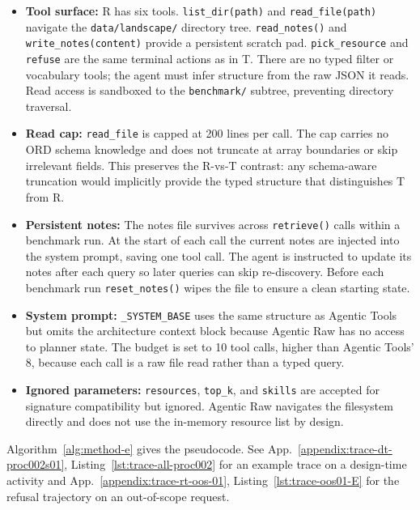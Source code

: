 \begin{itemize}
  \item \textbf{Tool surface:} R has six tools. \texttt{list\_dir(path)} and \texttt{read\_file(path)} navigate the \texttt{data/landscape/} directory tree. \texttt{read\_notes()} and \texttt{write\_notes(content)} provide a persistent scratch pad. \texttt{pick\_resource} and \texttt{refuse} are the same terminal actions as in T. There are no typed filter or vocabulary tools; the agent must infer structure from the raw JSON it reads. Read access is sandboxed to the \texttt{benchmark/} subtree, preventing directory traversal.

  \item \textbf{Read cap:} \texttt{read\_file} is capped at 200 lines per call. The cap carries no ORD schema knowledge and does not truncate at array boundaries or skip irrelevant fields. This preserves the R-vs-T contrast: any schema-aware truncation would implicitly provide the typed structure that distinguishes T from R.

  \item \textbf{Persistent notes:} The notes file survives across \texttt{retrieve()} calls within a benchmark run. At the start of each call the current notes are injected into the system prompt, saving one tool call. The agent is instructed to update its notes after each query so later queries can skip re-discovery. Before each benchmark run \texttt{reset\_notes()} wipes the file to ensure a clean starting state.

  \item \textbf{System prompt:} \texttt{\_SYSTEM\_BASE} uses the same structure as Agentic Tools but omits the architecture context block because Agentic Raw has no access to planner state. The budget is set to 10 tool calls, higher than Agentic Tools' 8, because each call is a raw file read rather than a typed query.

  \item \textbf{Ignored parameters:} \texttt{resources}, \texttt{top\_k}, and \texttt{skills} are accepted for signature compatibility but ignored. Agentic Raw navigates the filesystem directly and does not use the in-memory resource list by design.
\end{itemize}

Algorithm~\ref{alg:method-e} gives the pseudocode. See App.~\ref{appendix:trace-dt-proc002s01}, Listing~\ref{lst:trace-all-proc002} for an example trace on a design-time activity and App.~\ref{appendix:trace-rt-oos-01}, Listing~\ref{lst:trace-oos01-E} for the refusal trajectory on an out-of-scope request.



